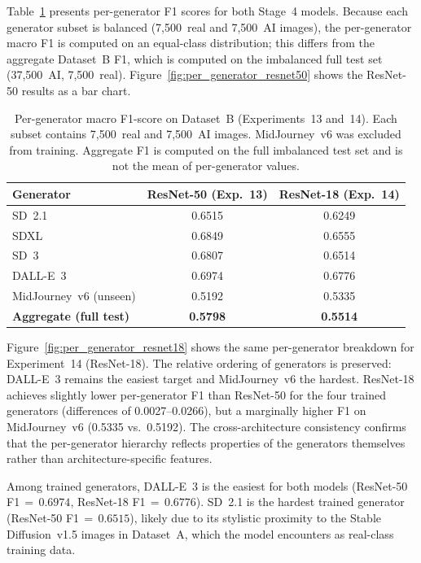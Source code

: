 Table~\ref{tab:per_generator} presents per-generator F1 scores for both Stage~4 models.
Because each generator subset is balanced (7,500~real and 7,500~AI images), the
per-generator macro F1 is computed on an equal-class distribution; this differs from the
aggregate Dataset~B F1, which is computed on the imbalanced full test set (37,500~AI,
7,500~real). Figure~\ref{fig:per_generator_resnet50} shows the ResNet-50 results as a
bar chart.

\begin{table}[h!]
  \centering
  \caption{Per-generator macro F1-score on Dataset~B (Experiments~13 and~14).
           Each subset contains 7,500~real and 7,500~AI images.
           MidJourney~v6 was excluded from training.
           Aggregate F1 is computed on the full imbalanced test set and is not
           the mean of per-generator values.}
  \label{tab:per_generator}
  \begin{tabular}{lcc}
    \hline
    \textbf{Generator} & \textbf{ResNet-50 (Exp.~13)} & \textbf{ResNet-18 (Exp.~14)} \\
    \hline
    SD~2.1              & 0.6515 & 0.6249 \\
    SDXL                & 0.6849 & 0.6555 \\
    SD~3                & 0.6807 & 0.6514 \\
    DALL-E~3            & 0.6974 & 0.6776 \\
    MidJourney~v6 (unseen) & 0.5192 & 0.5335 \\
    \hline
    \textbf{Aggregate (full test)} & \textbf{0.5798} & \textbf{0.5514} \\
    \hline
  \end{tabular}
\end{table}

Figure~\ref{fig:per_generator_resnet18} shows the same per-generator breakdown for
Experiment~14 (ResNet-18). The relative ordering of generators is preserved: DALL-E~3
remains the easiest target and MidJourney~v6 the hardest. ResNet-18 achieves slightly
lower per-generator F1 than ResNet-50 for the four trained generators (differences of
0.0027--0.0266), but a marginally higher F1 on MidJourney~v6 (0.5335 vs.\ 0.5192). The
cross-architecture consistency confirms that the per-generator hierarchy reflects
properties of the generators themselves rather than architecture-specific features.

Among trained generators, DALL-E~3 is the easiest for both models (ResNet-50
F1$\,{=}\,0.6974$, ResNet-18 F1$\,{=}\,0.6776$). SD~2.1 is the hardest trained generator
(ResNet-50 F1$\,{=}\,0.6515$), likely due to its stylistic proximity to the Stable
Diffusion~v1.5 images in Dataset~A, which the model encounters as real-class training data.

